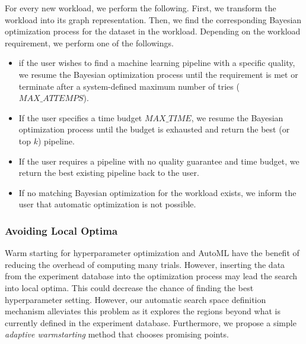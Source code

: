 For every new workload, we perform the following.
First, we transform the workload into its graph representation.
Then, we find the corresponding Bayesian optimization process for the dataset in the workload.
Depending on the workload requirement, we perform one of the followings.
\begin{itemize}
\item if the user wishes to find a machine learning pipeline with a specific quality, we resume the Bayesian optimization process until the requirement is met or terminate after a system-defined maximum number of tries ($MAX\_ATTEMPS$).
\item If the user specifies a time budget $MAX\_TIME$, we resume the Bayesian optimization process until the budget is exhausted and return the best (or top $k$) pipeline.
\item If the user requires a pipeline with no quality guarantee and time budget, we return the best existing pipeline back to the user.
\item If no matching Bayesian optimization for the workload exists, we inform the user that automatic optimization is not possible.
\end{itemize}

\subsubsection{Avoiding Local Optima}
Warm starting for hyperparameter optimization and AutoML have the benefit of reducing the overhead of computing many trials.
However, inserting the data from the experiment database into the optimization process may lead the search into local optima.
This could decrease the chance of finding the best hyperparameter setting.
However, our automatic search space definition mechanism alleviates this problem as it explores the regions beyond what is currently defined in the experiment database.
Furthermore, we propose a simple \textit{adaptive warmstarting} method that chooses promising points.




